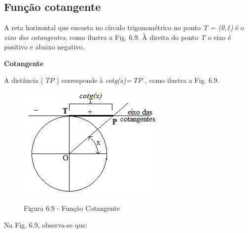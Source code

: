 \subsection{Função cotangente}

A reta horizontal que encosta no círculo trigonométrico no ponto \textit{T = (0,1)} é o \textit{eixo das cotangentes}, como ilustra a Fig. 6.9. À direita do ponto \textit{T} o eixo é positivo e abaixo negativo.

\begin{caixa}
\textbf{Cotangente}

\begin{multicols}{2}

A distância ( \( TP \) ) corresponde à \textit{cotg(x)= \(  TP \) , }como ilustra a Fig. 6.9.

\begin{figure}[H]
    \begin{Center}
        \includegraphics[width=2.81in,height=2.16in]{capitulos/trigonometria_e_funcoes_trigonometricas/media/image38.png}

        Figura 6.9 - Função Cotangente
    \end{Center}
\end{figure}

\end{multicols}
\end{caixa}

Na Fig. 6.9, observa-se que:

